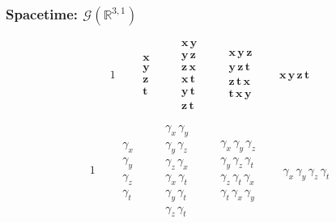 \documentclass[12pt,xcolor={dvipsnames}]{beamer}
\renewcommand{\vec}{\bm}
\renewcommand{\G}{\mathcal{G}}
\begin{document}
\begin{frame}
  \frametitle{Spacetime: $\G(\mathbb{R}^{3,1})$}
  \begin{equation*}
    1
    \qquad
    \begin{matrix}
      \vec{x} \\ \vec{y} \\ \vec{z} \\ \vec{t}
    \end{matrix}
    \qquad
    \begin{matrix}
      \vec{x}\,\vec{y} \\
      \vec{y}\, \vec{z} \\
      \vec{z}\, \vec{x} \\
      \vec{x}\,\vec{t} \\
      \vec{y}\,\vec{t} \\
      \vec{z}\,\vec{t}
    \end{matrix}
    \qquad
    \begin{matrix}
      \vec{x}\, \vec{y}\, \vec{z} \\
      \vec{y}\, \vec{z}\, \vec{t} \\
      \vec{z}\, \vec{t}\, \vec{x} \\
      \vec{t}\, \vec{x}\, \vec{y}
    \end{matrix}
    \qquad
    \vec{x}\, \vec{y}\, \vec{z}\, \vec{t}
  \end{equation*}
  \pause

  \begin{equation*}
    1
    \qquad
    \begin{matrix}
      \gamma_{x} \\ \gamma_{y} \\ \gamma_{z} \\ \gamma_{t}
    \end{matrix}
    \qquad
    \begin{matrix}
      \gamma_{x}\,\gamma_{y} \\
      \gamma_{y}\, \gamma_{z} \\
      \gamma_{z}\, \gamma_{x} \\
      \gamma_{x}\,\gamma_{t} \\
      \gamma_{y}\,\gamma_{t} \\
      \gamma_{z}\,\gamma_{t}
    \end{matrix}
    \qquad
    \begin{matrix}
      \gamma_{x}\, \gamma_{y}\, \gamma_{z} \\
      \gamma_{y}\, \gamma_{z}\, \gamma_{t} \\
      \gamma_{z}\, \gamma_{t}\, \gamma_{x} \\
      \gamma_{t}\, \gamma_{x}\, \gamma_{y}
    \end{matrix}
    \qquad
    \gamma_{x}\, \gamma_{y}\, \gamma_{z}\, \gamma_{t}
  \end{equation*}
\end{frame}
\end{document}

